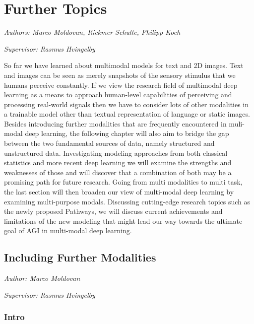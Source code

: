 \documentclass[
]{krantz}
\begin{document}
\hypertarget{c03-00-further}{%
\chapter{Further Topics}\label{c03-00-further}}

\emph{Authors: Marco Moldovan, Rickmer Schulte, Philipp Koch}

\emph{Supervisor: Rasmus Hvingelby}

So far we have learned about multimodal models for text and 2D images. Text and images can be seen as merely snapshots of the sensory stimulus that we humans perceive constantly. If we view the research field of multimodal deep learning as a means to approach human-level capabilities of perceiving and processing real-world signals then we have to consider lots of other modalities in a trainable model other than textual representation of language or static images. Besides introducing further modalities that are frequently encountered in muli-modal deep learning, the following chapter will also aim to bridge the gap between the two fundamental sources of data, namely structured and unstructured data. Investigating modeling approaches from both classical statistics and more recent deep learning we will examine the strengths and weaknesses of those and will discover that a combination of both may be a promising path for future research. Going from multi modalities to multi task, the last section will then broaden our view of multi-modal deep learning by examining multi-purpose modals. Discussing cutting-edge research topics such as the newly proposed Pathways, we will discuss current achievements and limitations of the new modeling that might lead our way towards the ultimate goal of AGI in multi-modal deep learning.

\hypertarget{c03-01-further-modalities}{%
\section{Including Further Modalities}\label{c03-01-further-modalities}}

\emph{Author: Marco Moldovan}

\emph{Supervisor: Rasmus Hvingelby}

\hypertarget{intro}{%
\subsection{Intro}\label{intro}}
\end{document}
